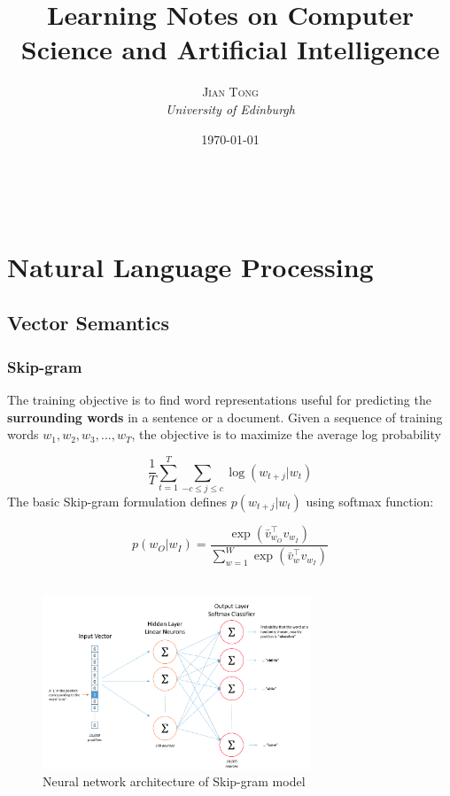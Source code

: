 \documentclass[a3paper, 12pt]{book} %
\title{\textbf{Learning Notes on Computer Science and Artificial Intelligence}\\ %
} %
\author{\textsc{Jian Tong} %
\\{\textit{University of Edinburgh}}} %
\date{\today} %
\makeatletter
\renewcommand{\maketitle}{ %
\begin{flushright} %
{\LARGE\@title} %

\vspace{50pt} %

{\large\@author} %
\\\@date %

\vspace{40pt} %
\end{flushright}
}
\makeatother
\begin{document}
\maketitle %

\vspace{30pt} %

\part{Natural Language Processing}


\chapter{Vector Semantics}
\section{Skip-gram}
The training objective is to find word representations useful for predicting the \textbf{surrounding words} in a sentence or a document. Given a sequence of training words $w_1,w_2,w_3,...,w_T$, the objective is to maximize the average log probability

$$\frac{1}{T}\sum_{t=1}^{T}{\sum_{-c\le{j\le{c}}}{\log(w_{t+j}|w_t)}}$$
The basic Skip-gram formulation defines $p(w_{t+j}|w_t)$ using softmax function:

$$p(w_O|w_I)=\frac{\exp{(\bar{v}_{w_{O}}^{\top}v_{w_{I}})}}{\sum_{w=1}^{W}{\exp{(\bar{v}_{w}^{\top}v_{w_{I}})}}}$$ \\

\begin{figure}[htpb]
	\centering
	\includegraphics[width=8cm]{figures/skip_gram_architecture.png}
	\caption{Neural network architecture of Skip-gram model}
	\label{fig:boat1}
\end{figure}
\end{document}

